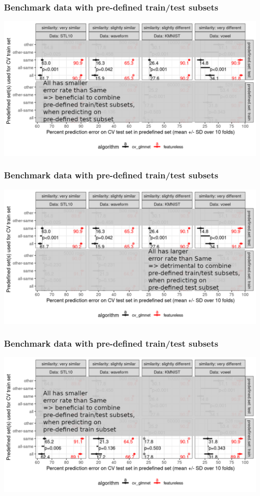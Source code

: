 \documentclass[t]{beamer}
\begin{document}
\begin{frame}
  \frametitle{Benchmark data with pre-defined train/test subsets}
  \includegraphics[width=\textwidth]{data_Classif_batchmark_registry_glmnet_featureless_mean_sd_similar_all_test}
\end{frame}

\begin{frame}
  \frametitle{Benchmark data with pre-defined train/test subsets}
  \includegraphics[width=\textwidth]{data_Classif_batchmark_registry_glmnet_featureless_mean_sd_different_all_test}
\end{frame}

\begin{frame}
  \frametitle{Benchmark data with pre-defined train/test subsets}
  \includegraphics[width=\textwidth]{data_Classif_batchmark_registry_glmnet_featureless_mean_sd_similar_all_train}
\end{frame}
\end{document}

